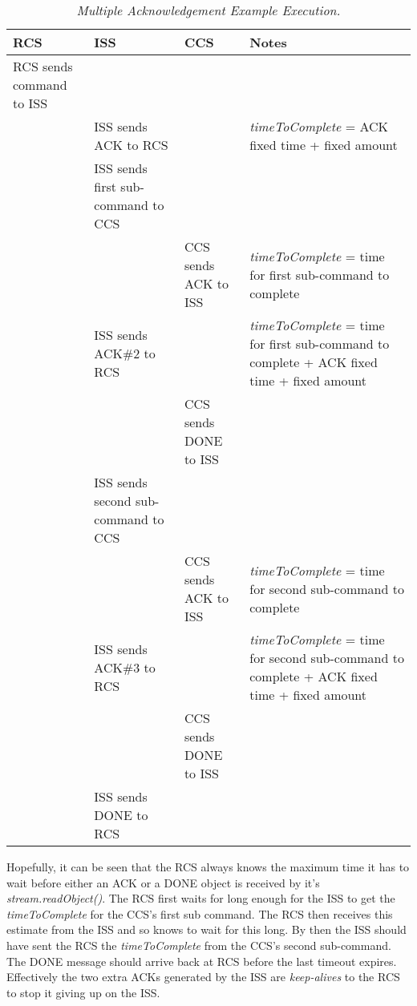 \documentclass[10pt,a4paper]{article}
\begin{document}
\begin{table}[!h]
\begin{center}
\begin{tabular}{|p{10em}|p{10em}|p{10em}|p{10em}|}
\hline
{\bf RCS} & {\bf ISS} & {\bf CCS} & {\bf Notes} \\
\hline
RCS sends command to ISS	&					&			& \\ \hline
				& ISS sends ACK to RCS			&			& {\em timeToComplete} = ACK fixed time + fixed amount\\ \hline
				& ISS sends first sub-command to CCS	&			& \\ \hline
				&					& CCS sends ACK to ISS	& {\em timeToComplete} = time for first sub-command to complete\\ \hline
				& ISS sends ACK\#2 to RCS		&			& {\em timeToComplete} = time for first sub-command to complete + ACK fixed time + fixed amount\\ \hline
				&					& CCS sends DONE to ISS & \\ \hline
				& ISS sends second sub-command to CCS	&			& \\ \hline
				&					& CCS sends ACK to ISS	& {\em timeToComplete} = time for second sub-command to complete\\ \hline
				& ISS sends ACK\#3 to RCS		& 			& {\em timeToComplete} = time for second sub-command to complete + ACK fixed time + fixed amount\\ \hline
				&					& CCS sends DONE to ISS	& \\ \hline
				& ISS sends DONE to RCS			&			& \\ \hline
\end{tabular}
\end{center}
\caption{\em Multiple Acknowledgement Example Execution.}
\label{tab:multipleackexample}
\end{table}

Hopefully, it can be seen that the RCS always knows the maximum time it has to wait before either an ACK or a DONE
object is received by it's {\em stream.readObject()}. The RCS first waits for long enough for the ISS to get
the {\em timeToComplete} for the CCS's first sub command. The RCS then receives this estimate from the ISS and so knows
to wait for this long. By then the ISS should have sent the RCS the {\em timeToComplete} from the CCS's second 
sub-command.
The DONE message should arrive back at RCS before the last timeout expires. Effectively the two extra ACKs generated
by the ISS are {\em keep-alives} to the RCS to stop it giving up on the ISS.
\end{document}
